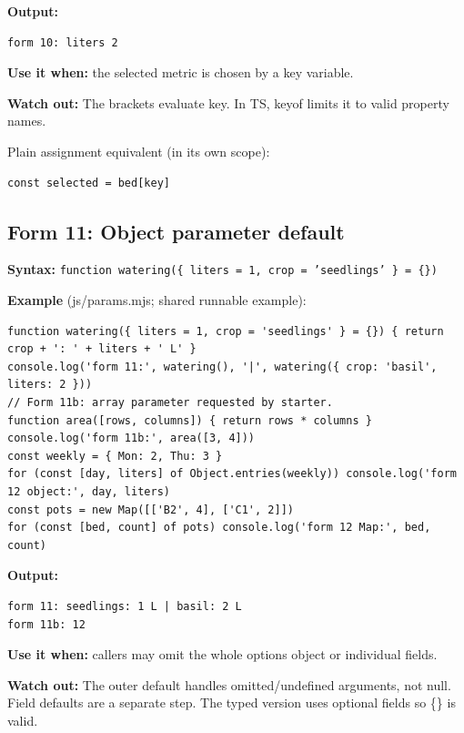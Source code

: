 \documentclass[
  10pt,
  a4paper,
]{article}
\begin{document}
\textbf{Output:}

\begin{lstlisting}
form 10: liters 2
\end{lstlisting}

\textbf{Use it when:} the selected metric is chosen by a key variable.

\textbf{Watch out:} The brackets evaluate key. In TS, keyof limits it to
valid property names.

Plain assignment equivalent (in its own scope):

\begin{lstlisting}
const selected = bed[key]
\end{lstlisting}

\subsection{Form 11: Object parameter
default}\label{form-11-object-parameter-default}

\textbf{Syntax:}
\texttt{function watering(\{ liters =\allowbreak{} 1,\allowbreak{} crop =\allowbreak{} 'seedlings' \} =\allowbreak{} \{\})}

\textbf{Example} (js/params.mjs; shared runnable example):

\begin{lstlisting}
function watering({ liters = 1, crop = 'seedlings' } = {}) { return crop + ': ' + liters + ' L' }
console.log('form 11:', watering(), '|', watering({ crop: 'basil', liters: 2 }))
// Form 11b: array parameter requested by starter.
function area([rows, columns]) { return rows * columns }
console.log('form 11b:', area([3, 4]))
const weekly = { Mon: 2, Thu: 3 }
for (const [day, liters] of Object.entries(weekly)) console.log('form 12 object:', day, liters)
const pots = new Map([['B2', 4], ['C1', 2]])
for (const [bed, count] of pots) console.log('form 12 Map:', bed, count)
\end{lstlisting}

\textbf{Output:}

\begin{lstlisting}
form 11: seedlings: 1 L | basil: 2 L
form 11b: 12
\end{lstlisting}

\textbf{Use it when:} callers may omit the whole options object or
individual fields.

\textbf{Watch out:} The outer default handles omitted/undefined
arguments, not null. Field defaults are a separate step. The typed
version uses optional fields so \{\} is valid.
\end{document}
